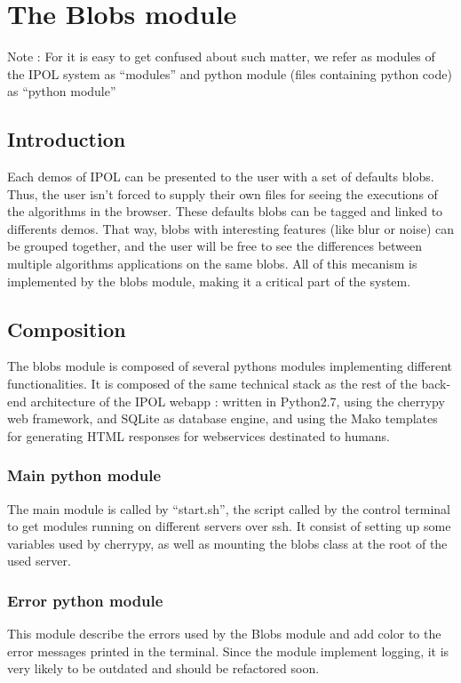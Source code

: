 \section{The Blobs module}

Note : For it is easy to get confused about such matter, we refer as modules of the IPOL system as ``modules'' and python module (files containing python code) as ``python module''

\subsection{Introduction}
Each demos of IPOL can be presented to the user with a set of defaults blobs. Thus, the user isn't forced to supply their own files for seeing the executions of the algorithms in the browser. These defaults blobs can be tagged and linked to differents demos. That way, blobs with interesting features (like blur or noise) can be grouped together, and the user will be free to see the differences between multiple algorithms applications on the same blobs. All of this mecanism is implemented by the blobs module, making it a critical part of the system.

\subsection{Composition}
The blobs module is composed of several pythons modules implementing different functionalities. It is composed of the same technical stack as the rest of the back-end architecture of the IPOL webapp : written in Python2.7, using the cherrypy web framework, and SQLite as database engine, and using the Mako templates for generating HTML responses for webservices destinated to humans.

\subsubsection{Main python module}
The main module is called by ``start.sh'', the script called by the control terminal to get modules running on different servers over ssh. It consist of setting up some variables used by cherrypy, as well as mounting the blobs class at the root of the used server.

\subsubsection{Error python module}
This module describe the errors used by the Blobs module and add color to the error messages printed in the terminal. Since the module implement logging, it is very likely to be outdated and should be refactored soon.


